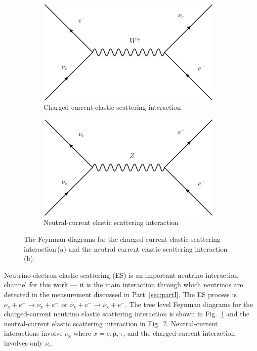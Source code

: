 \label{sec:esxsec}
\begin{figure}
\centering
\begin{subfigure}[t]{0.48\textwidth}
\centering
    \includegraphics[width=\textwidth]{cc_es}
    \caption[Charged Current Elastic Scattering Feynman Diagram]{
Charged-current elastic scattering interaction}
\label{fig:ES_CC}
\end{subfigure}
\hfill
\begin{subfigure}[t]{0.48\textwidth}
\centering
    \includegraphics[width=\textwidth]{nc_es}
\caption[Neutral Current Elastic Scattering Feynman Diagram]{
Neutral-current elastic scattering interaction}
\label{fig:ES_NC}
\end{subfigure}
\label{fig:feynman_es}
\caption[Elastic Scattering Feynman Diagrams]{The Feynman diagrams for the
    charged-current elastic scattering interaction\,(a) and the neutral
    current elastic scattering interaction\,(b).}
\end{figure}

Neutrino-electron elastic scattering (ES) is an important neutrino interaction
channel for this work --- it is the main interaction through which neutrinos are
detected in the measurement discussed in Part~\ref{sec:partI}.
The ES process is $\nu_{\mathrm{x}} + e^{-} \rightarrow \nu_{\mathrm{x}} +e^{-}$
or $\overline{\nu}_{\mathrm{x}} + e^{-} \rightarrow \overline{\nu}_{\mathrm{x}} +e^{-}$.
The tree level Feynman diagrams for the charged-current neutrino elastic scattering
interaction is shown in Fig.~\ref{fig:ES_CC} and the neutral-current elastic
scattering interaction in Fig.~\ref{fig:ES_NC}.
Neutral-current interactions involve $\nu_{\mathrm{x}}$ where $x=\mathrm{e, \mu, \tau}$,
and the charged-current interaction involves only $\nu_{\mathrm{e}}$.

